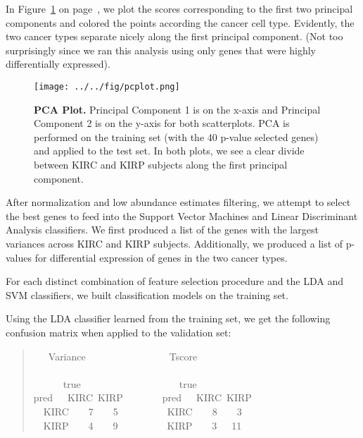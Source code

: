 In Figure~\ref{fig:pca} on page~\pageref{fig:pca}, we plot the scores
corresponding to the first two principal components and colored the points
according the cancer cell type.  Evidently, the two cancer types separate
nicely along the first principal component. (Not too surprisingly since we ran
this analysis using only genes that were highly differentially expressed).  

\begin{figure}[H]
  \centering
    \texttt{[image: ../../fig/pcplot.png]}
\caption{\textbf{PCA Plot.} Principal Component 1 is on the x-axis and Principal
  Component 2 is on the y-axis for both scatterplots.  PCA is performed on the
  training set (with the 40 p-value selected genes) and applied to the test set.
  In both plots, we see a clear divide between 	KIRC and KIRP subjects along
  the first principal component.}
   \label{fig:pca}
\end{figure}

After normalization and low abundance estimates filtering, we attempt to select the
best genes to feed into the Support Vector Machines and Linear Discriminant
Analysis classifiers.  We first produced a list of the genes with the largest
variances across KIRC and KIRP subjects.
Additionally, we produced a list of p-values for
differential expression of genes in the two cancer types.


For each distinct combination of feature selection procedure and the LDA and
SVM classifiers, we built classification models on the training set.

Using the LDA classifier learned from the training set, we get the following
confusion matrix when applied to the validation set:

\begin{quote}{  \ttfamily \raggedright \noindent
\centering
~~~Variance~~~~~~~~~~~~~~~~~Tscore\\
~\\
~~~~~~true~~~~~~~~~~~~~~~~~~~~true\\
pred~~~KIRC~KIRP~~~~~~~~pred~~~KIRC~KIRP\\
~~KIRC~~~~7~~~~5~~~~~~~~~~KIRC~~~~8~~~~3\\
~~KIRP~~~~4~~~~9~~~~~~~~~~KIRP~~~~3~~~11\\
}
\end{quote}

